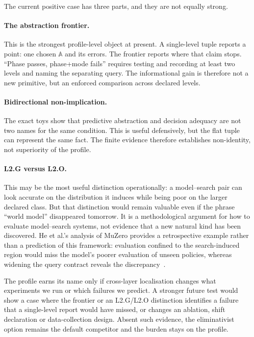 \documentclass[10pt]{article}
\newcommand{\Aabs}{\mathbb A}
\begin{document}
The current positive case has three parts, and they are not equally strong.

\paragraph{The abstraction frontier.}
This is the strongest profile-level object at present. A single-level tuple reports a point: one chosen $\Aabs$ and its errors. The frontier reports where that claim stops. ``Phase passes, phase+mode fails'' requires testing and recording at least two levels and naming the separating query. The informational gain is therefore not a new primitive, but an enforced comparison across declared levels.

\paragraph{Bidirectional non-implication.}
The exact toys show that predictive abstraction and decision adequacy are not two names for the same condition. This is useful defensively, but the flat tuple can represent the same fact. The finite evidence therefore establishes non-identity, not superiority of the profile.

\paragraph{L2.G versus L2.O.}
This may be the most useful distinction operationally: a model--search pair can look accurate on the distribution it induces while being poor on the larger declared class. But that distinction would remain valuable even if the phrase ``world model'' disappeared tomorrow. It is a methodological argument for how to evaluate model--search systems, not evidence that a new natural kind has been discovered. He et al.'s analysis of MuZero provides a retrospective example rather than a prediction of this framework: evaluation confined to the search-induced region would miss the model's poorer evaluation of unseen policies, whereas widening the query contract reveals the discrepancy~\cite{he2024}.

The profile earns its name only if cross-layer localisation changes what experiments we run or which failures we predict. A stronger future test would show a case where the frontier or an L2.G/L2.O distinction identifies a failure that a single-level report would have missed, or changes an ablation, shift declaration or data-collection design. Absent such evidence, the eliminativist option remains the default competitor and the burden stays on the profile.
\end{document}

